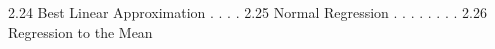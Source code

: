 2.24 Best Linear Approximation . . . .
2.25 Normal Regression . . . . . . . .
2.26 Regression to the Mean
